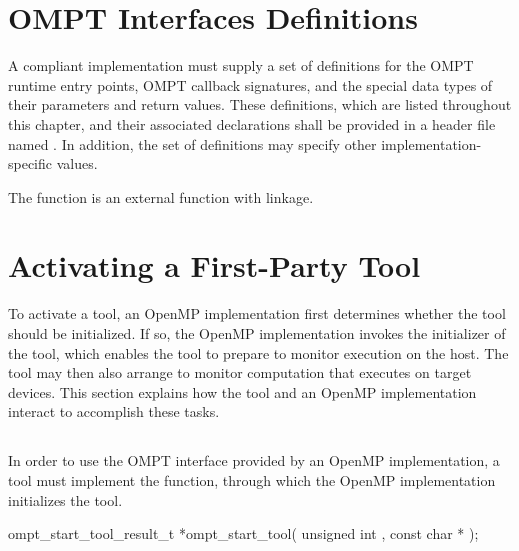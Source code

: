 \section{OMPT Interfaces Definitions}
\label{sec:OMPT Interfaces Definitions}

\begin{ccppspecific}
A compliant implementation must supply a set of definitions for the OMPT runtime
entry points, OMPT callback signatures, and the special data types of
their parameters and return values. These definitions, which are listed throughout
this chapter, and their associated declarations shall be provided in a header file
named . In addition, the set of definitions may specify other
implementation-specific values.

The  function is an external function with  linkage.
\end{ccppspecific}

\section{Activating a First-Party Tool}
\label{sec:ompt-initialization}

To activate a tool, an OpenMP implementation first determines whether 
the tool should be initialized. If so, the OpenMP implementation invokes 
the initializer of the tool, which enables the tool to prepare to monitor 
execution on the host. The tool may then also arrange to monitor computation 
that executes on target devices. This section explains how the tool and an
OpenMP implementation interact to accomplish these tasks.

\subsection{}
\label{sec:ompt_start_tool}

\summary
In order to use the OMPT interface provided by an OpenMP implementation,
a tool must implement the  function, through which 
the OpenMP implementation initializes the tool.

\format
\begin{cspecific}
\begin{omptOther}
ompt_start_tool_result_t *ompt_start_tool(
  unsigned int ,
  const char *
);
\end{omptOther}
\end{cspecific}

